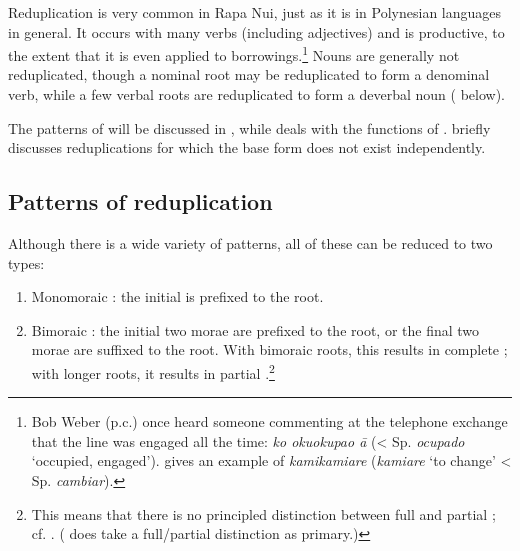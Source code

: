Reduplication is very common in Rapa Nui, just as it is in Polynesian languages in general. It occurs with many verbs (including adjectives) and is productive, to the extent that it is even applied to borrowings.\footnote{\label{fn:70}Bob Weber (p.c.) once heard someone commenting at the telephone exchange that the line was engaged all the time: \textit{ko okuokupao {\ꞌ}ā} ({\textless} Sp. \textit{ocupado} ‘occupied, engaged’). \citet[198]{Makihara2001Adaptation} gives an example of \textit{kamikamiare} (\textit{kamiare} ‘to change’ {\textless} Sp. \textit{cambiar}).} Nouns are generally not reduplicated, though a nominal root may be reduplicated to form a denominal verb, while a few verbal roots are reduplicated to form a deverbal noun ( below). 

The patterns of  will be discussed in , while  deals with the functions of .  briefly discusses reduplications for which the base form does not exist independently.

\subsection{Patterns of reduplication}\label{sec:2.6.1}
Although there is a wide variety of  patterns, all of these can be reduced to two types:

\begin{enumerate}
\item 
Monomoraic : the initial  is prefixed to the root.

\item 
Bimoraic : the initial two morae are prefixed to the root, or the final two morae are suffixed to the root. With bimoraic roots, this results in complete ; with longer roots, it results in partial .\footnote{\label{fn:71}This means that there is no principled distinction between full and partial ; cf. \citet[39]{Blust2001}. (\citealt{Davletshin2015} does take a full/partial distinction as primary.)} 

\end{enumerate}

